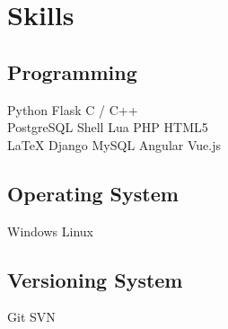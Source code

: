\documentclass[top=0in]{deedy-resume-openfont}
\begin{document}
%
%
\lastupdated

%
%

%
%

\begin{minipage}[t]{0.33\textwidth} 


\section{Skills}
\subsection{Programming}
Python 
\textbullet{} Flask 
\textbullet{} C / C++
\vspace{\topsep}
\\
PostgreSQL
\textbullet{} Shell 
\textbullet{} Lua
\textbullet{} PHP
\textbullet{} HTML5
\vspace{\topsep}
\\
\LaTeX
\textbullet{} Django
\textbullet{} MySQL
\textbullet{} Angular
\textbullet{} Vue.js
\sectionsep

\subsection{Operating System}
Windows 
\textbullet{} Linux 
\sectionsep

\subsection{Versioning System}
Git 
\textbullet{} SVN 
\sectionsep



\end{minipage}
\end{document}
